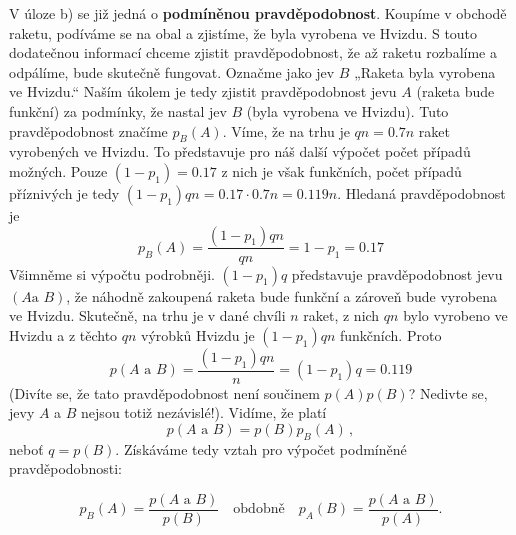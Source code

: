 \begin{mdframed}[style=mdexam]
\begin{example}
      V úloze b) se již jedná o \textbf{podmíněnou pravděpodobnost}. Koupíme v obchodě raketu,
      podíváme se na obal a zjistíme, že byla vyrobena ve Hvizdu. S touto dodatečnou informací
      chceme zjistit pravděpodobnost, že až raketu rozbalíme a odpálíme, bude skutečně fungovat.
      Označme jako jev \(B\) „Raketa byla vyrobena ve Hvizdu.“ Naším úkolem je tedy zjistit
      pravděpodobnost jevu \(A\) (raketa bude funkční) za podmínky, že nastal jev \(B\) (byla
      vyrobena ve Hvizdu). Tuto pravděpodobnost značíme \(p_B(A)\). Víme, že na trhu je \(qn =
      \num{0.7}n\) raket vyrobených ve Hvizdu. To představuje pro náš další výpočet počet případů
      možných. Pouze \((1 - p_1) = \num{0.17}\) z nich je však funkčních, počet případů příznivých
      je tedy \((1 - p_1)qn = \num{0.17}\cdot\num{0.7}n = \num{0.119}n\). Hledaná pravděpodobnost je
      \begin{equation*}
        p_B(A) = \dfrac{(1 - p_1)qn}{qn} = 1 - p_1 = \num{0.17}
      \end{equation*}
      Všimněme si výpočtu podrobněji. \((1 - p_1)q\) představuje pravděpodobnost jevu \((A\text{
      a }B)\), že náhodně zakoupená raketa bude funkční a zároveň bude vyrobena ve Hvizdu. Skutečně,
      na trhu je v dané chvíli \(n\) raket, z nich \(qn\) bylo vyrobeno ve Hvizdu a z těchto \(qn\)
      výrobků Hvizdu je \((1 - p_1)qn\) funkčních. Proto 
      \begin{equation*}
        p(A\text{ a }B) = \dfrac{(1 - p_1)qn}{n} = (1 - p_1)q = \num{0.119}
      \end{equation*}
      (Divíte se, že tato pravděpodobnost není součinem \(p(A)p(B)\)? Nedivte se, jevy \(A\) a \(B\)
      nejsou totiž nezávislé!). Vidíme, že platí
      \begin{equation*}
        \boxed{p(A\text{ a }B) = p(B)p_B(A)}\,,
      \end{equation*}
      neboť \(q = p(B)\). Získáváme tedy vztah pro výpočet podmíněné pravděpodobnosti:
      \begin{mdframed}[style=highlight]
        \begin{equation}\label{mai:eq057}
          p_B(A) = \dfrac{p(A\text{ a }B)}{p(B)} \quad\text{obdobně}\quad
          p_A(B) = \dfrac{p(A\text{ a }B)}{p(A)}.
        \end{equation}
      \end{mdframed}
    

\end{example}
\end{mdframed}
